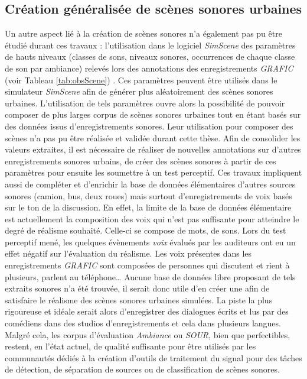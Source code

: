\subsection*{Création généralisée de scènes sonores urbaines}
Un autre aspect lié à la création de scènes sonores n'a également pas pu être étudié durant ces travaux :  l'utilisation dans le logiciel \textit{SimScene} des paramètres de hauts niveaux (classes de sons, niveaux sonores, occurrences de chaque classe de son par ambiance) relevés lors des annotations des enregistrements \textit{GRAFIC} (voir Tableau \ref{tab:obsScene}) .
Ces paramètres peuvent être utilisés dans le simulateur \textit{SimScene} afin de générer plus aléatoirement des scènes sonores urbaines. L'utilisation de tels paramètres ouvre alors la possibilité de pouvoir composer de plus larges corpus de scènes sonores urbaines tout en étant basés sur des données issus d'enregistrements sonores. Leur utilisation pour composer des scènes n'a pas pu être réalisée et validée durant cette thèse. Afin de consolider les valeurs extraites, il est nécessaire de réaliser de nouvelles annotations sur d'autres enregistrements sonores urbains, de créer des scènes sonores à partir de ces paramètres pour ensuite les soumettre à un test perceptif.
Ces travaux impliquent aussi de compléter et d'enrichir la base de données élémentaires d'autres sources sonores (camion, bus, deux roues) mais surtout d'enregistrements de voix basés sur le ton de la discussion. En effet, la limite de la base de données élémentaire est actuellement la composition des voix qui n'est pas suffisante pour atteindre le degré de réalisme souhaité. Celle-ci se compose de mots, de sons. Lors du test perceptif mené, les quelques évènements \textit{voix} évalués par les auditeurs ont eu un effet négatif sur l'évaluation du réalisme. Les voix présentes dans les enregistrements \textit{GRAFIC} sont composées de personnes qui discutent et rient à plusieurs, parlent au téléphone\dots{} 
Aucune base de données libre proposant de tels extraits sonores n'a été trouvée, il serait donc utile d'en créer une afin de satisfaire le réalisme des scènes sonores urbaines simulées. La piste la plus rigoureuse et idéale serait alors d'enregistrer des dialogues écrits et lus par des comédiens dans des studios d'enregistrements et cela dans plusieurs langues. Malgré cela, les corpus d'évaluation \textit{Ambiance} ou \textit{SOUR}, bien que perfectibles, restent, en l'état actuel, de qualité suffisante pour être utilisés par les communautés dédiés à la création d'outils de traitement du signal pour des tâches de détection, de séparation de sources ou de classification de scènes sonores.

